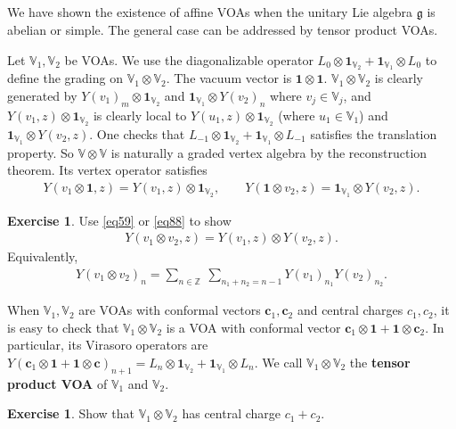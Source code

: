 \documentclass[12pt,a4paper,notitlepage]{article}
\theoremstyle{definition}
\newtheorem{exe}[df]{Exercise}
\theoremstyle{plain}
\newcommand{\id}{\mathbf{1}}
\newcommand{\gk}{\mathfrak g}
\newcommand{\Vbb}{\mathbb V}
\newcommand{\Zbb}{\mathbb Z}
\newcommand{\cbf}{\mathbf c}
\numberwithin{equation}{section}
\begin{document}
\subsection{}\label{lb58}

We have shown the existence of affine VOAs when the unitary Lie algebra $\gk$ is abelian or simple. The general case can be addressed by  tensor product VOAs.

Let $\Vbb_1,\Vbb_2$ be VOAs. We use the diagonalizable operator $L_0\otimes\id_{\Vbb_2}+\id_{\Vbb_1}\otimes L_0$ to define the grading on $\Vbb_1\otimes\Vbb_2$. The vacuum vector is $\id\otimes\id$. $\Vbb_1\otimes\Vbb_2$ is clearly generated by $Y(v_1)_m\otimes\id_{\Vbb_2}$ and $\id_{\Vbb_1}\otimes Y(v_2)_n$ where $v_j\in\Vbb_j$, and $Y(v_1,z)\otimes\id_{\Vbb_2}$ is clearly local to  $Y(u_1,z)\otimes\id_{\Vbb_2}$ (where $u_1\in\Vbb_1$) and $\id_{\Vbb_1}\otimes Y(v_2,z)$. One checks that $L_{-1}\otimes\id_{\Vbb_2}+\id_{\Vbb_1}\otimes L_{-1}$ satisfies the translation property. So $\Vbb\otimes\Vbb$ is naturally a graded vertex algebra by the reconstruction theorem. Its vertex operator satisfies
\begin{align}
Y(v_1\otimes\id,z)=Y(v_1,z)\otimes\id_{\Vbb_2},\qquad Y(\id\otimes v_2,z)=\id_{\Vbb_1}\otimes Y(v_2,z).
\end{align}


\begin{exe}
Use \eqref{eq59} or \eqref{eq88} to show
\begin{align}
Y(v_1\otimes v_2,z)=Y(v_1,z)\otimes Y(v_2,z).
\end{align}
Equivalently,
\begin{align}
Y(v_1\otimes v_2)_n=\sum_{n\in\Zbb}~ \sum_{n_1+n_2=n-1}Y(v_1)_{n_1}Y(v_2)_{n_2}.	
\end{align}
\end{exe}
 
When $\Vbb_1,\Vbb_2$ are VOAs with conformal vectors $\cbf_1,\cbf_2$ and central charges $c_1,c_2$, it is easy to check that $\Vbb_1\otimes\Vbb_2$ is a VOA with conformal vector $\cbf_1\otimes\id+\id\otimes\cbf_2$. In particular, its Virasoro operators are $Y(\cbf_1\otimes\id+\id\otimes\cbf)_{n+1}=L_n\otimes\id_{\Vbb_2}+\id_{\Vbb_1}\otimes L_n$. We call $\Vbb_1\otimes\Vbb_2$ the \textbf{tensor product VOA} of $\Vbb_1$ and $\Vbb_2$.

\begin{exe}
Show that $\Vbb_1\otimes\Vbb_2$ has central charge $c_1+c_2$.
\end{exe}
\end{document}
